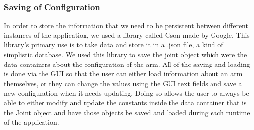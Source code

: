 \subsubsection{Saving of Configuration}
In order to store the information that we need to be persistent between different instances of the application, we used a library called Gson made by Google. This library's primary use is to take data and store it in a .json file, a kind of simplistic database.  We used this library to save the joint object which were the data containers about the configuration of the arm. All of the saving and loading is done via the GUI so that the user can either load information about an arm themselves, or they can change the values using the GUI text fields and save a new configuration when it needs updating. Doing so allows the user to always be able to either modify and update the constants inside the data container that is the Joint object and have those objects be saved and loaded during each runtime of the application. 




